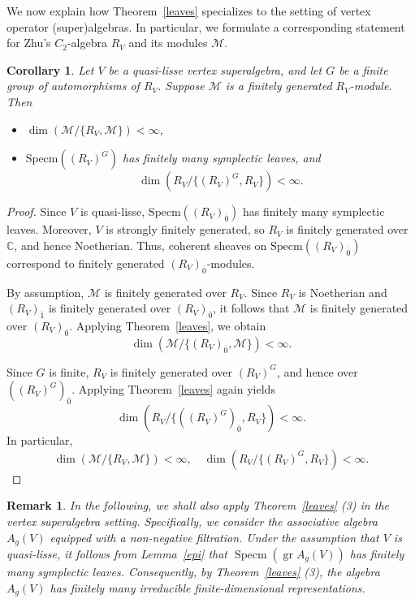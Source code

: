 \documentclass[9pt]{amsart}
\newtheorem{corollary}{Corollary}[section]
\newtheorem{remark}{Remark}[section]
\begin{document}
We now explain how Theorem~\ref{leaves} specializes to the setting of vertex operator (super)algebras. In particular, we formulate a corresponding statement for Zhu's \( C_2 \)-algebra \( R_V \) and its modules $\mathcal{M}$.
\begin{corollary}\label{leaves'}
Let $V$ be a quasi-lisse vertex superalgebra,%
and let $G$ be a finite group of automorphisms of $R_V$. Suppose $\mathcal{M}$ is a finitely generated $R_V$-module. Then
\begin{itemize}
    \item $\dim(\mathcal{M} / \{R_V, \mathcal{M}\}) < \infty$,
    \item $\mathrm{Specm}((R_V)^G)$ has finitely many symplectic leaves, and 
    \[
    \dim(R_V / \{(R_V)^G, R_V\}) < \infty.
    \]
\end{itemize}
\end{corollary}
\begin{proof}
Since \( V \) is quasi-lisse, \( \mathrm{Specm}((R_V)_{\overline{0}}) \) has finitely many symplectic leaves. Moreover, \( V \) is strongly finitely generated, so \( R_V \) is finitely generated over \( \mathbb{C} \), and hence Noetherian. Thus, coherent sheaves on \( \mathrm{Specm}((R_V)_{\overline{0}}) \) correspond to finitely generated \((R_V)_{\overline{0}}\)-modules.

By assumption, \( \mathcal{M} \) is finitely generated over \( R_V \). Since \( R_V \) is Noetherian and \((R_V)_{\overline{1}}\) is finitely generated over \((R_V)_{\overline{0}}\), it follows that \( \mathcal{M} \) is finitely generated over \((R_V)_{\overline{0}}\). Applying Theorem~\ref{leaves}, we obtain
\[
\dim(\mathcal{M} / \{(R_V)_{\overline{0}}, \mathcal{M}\}) < \infty.
\]

Since \( G \) is finite, \( R_V \) is finitely generated over \((R_V)^G\), and hence over \(((R_V)^G)_{\overline{0}}\). Applying Theorem~\ref{leaves} again yields
\[
\dim(R_V / \{((R_V)^G)_{\overline{0}}, R_V\}) < \infty.
\]
In particular,
\[
\dim(\mathcal{M} / \{R_V, \mathcal{M}\}) < \infty, \quad \dim(R_V / \{(R_V)^G, R_V\}) < \infty.
\]
\end{proof}

\begin{remark}\label{ESZhu}
In the following, we shall also apply Theorem~\ref{leaves} (3) in the vertex superalgebra setting. Specifically, we consider the associative algebra \( A_g(V) \) equipped with a non-negative filtration. Under the assumption that \( V \) is quasi-lisse, it follows from Lemma~\ref{epi} that \( \operatorname{Specm}(\operatorname{gr} A_g(V)) \) has finitely many symplectic leaves. Consequently, by Theorem~\ref{leaves} (3), the algebra \( A_g(V) \) has finitely many irreducible finite-dimensional representations.
\end{remark}	
\end{document}
